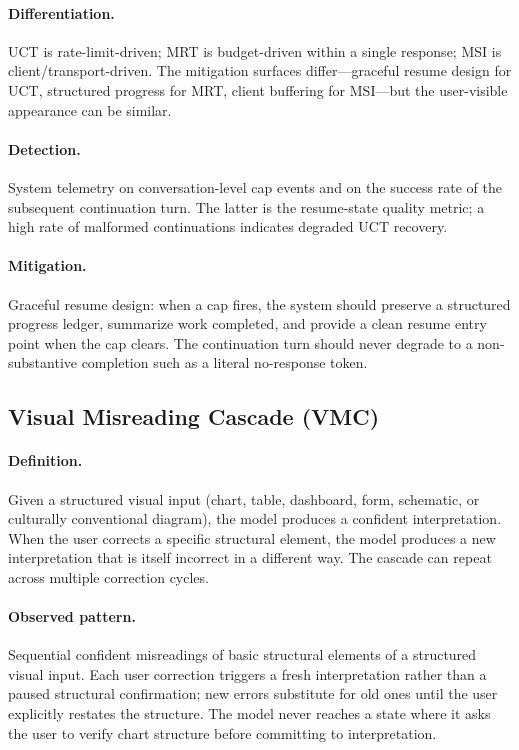 \documentclass[11pt]{article}
\begin{document}
\paragraph{Differentiation.} UCT is rate-limit-driven; MRT is budget-driven within a single response; MSI is client/transport-driven. The mitigation surfaces differ---graceful resume design for UCT, structured progress for MRT, client buffering for MSI---but the user-visible appearance can be similar.

\paragraph{Detection.} System telemetry on conversation-level cap events and on the success rate of the subsequent continuation turn. The latter is the resume-state quality metric; a high rate of malformed continuations indicates degraded UCT recovery.

\paragraph{Mitigation.} Graceful resume design: when a cap fires, the system should preserve a structured progress ledger, summarize work completed, and provide a clean resume entry point when the cap clears. The continuation turn should never degrade to a non-substantive completion such as a literal no-response token.

\subsection{Visual Misreading Cascade (VMC)}
\paragraph{Definition.} Given a structured visual input (chart, table, dashboard, form, schematic, or culturally conventional diagram), the model produces a confident interpretation. When the user corrects a specific structural element, the model produces a new interpretation that is itself incorrect in a different way. The cascade can repeat across multiple correction cycles.

\paragraph{Observed pattern.} Sequential confident misreadings of basic structural elements of a structured visual input. Each user correction triggers a fresh interpretation rather than a paused structural confirmation; new errors substitute for old ones until the user explicitly restates the structure. The model never reaches a state where it asks the user to verify chart structure before committing to interpretation.
\end{document}
